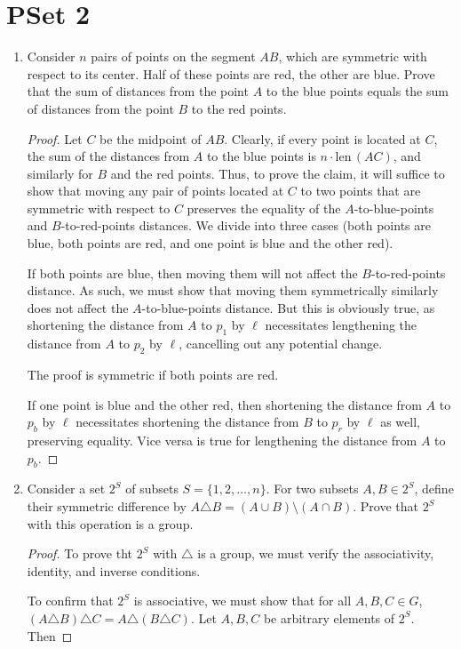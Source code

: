\documentclass[../apprentice.tex]{subfiles}
\begin{document}
\section{PSet 2}
\begin{enumerate}
    \item {}Consider $n$ pairs of points on the segment $AB$, which are symmetric with respect to its center. Half of these points are red, the other are blue. Prove that the sum of distances from the point $A$ to the blue points equals the sum of distances from the point $B$ to the red points.
    \begin{proof}
        Let $C$ be the midpoint of $AB$. Clearly, if every point is located at $C$, the sum of the distances from $A$ to the blue points is $n\cdot\text{len}\,(AC)$, and similarly for $B$ and the red points. Thus, to prove the claim, it will suffice to show that moving any pair of points located at $C$ to two points that are symmetric with respect to $C$ preserves the equality of the $A$-to-blue-points and $B$-to-red-points distances. We divide into three cases (both points are blue, both points are red, and one point is blue and the other red).\par
        If both points are blue, then moving them will not affect the $B$-to-red-points distance. As such, we must show that moving them symmetrically similarly does not affect the $A$-to-blue-points distance. But this is obviously true, as shortening the distance from $A$ to $p_1$ by $\ell$ necessitates lengthening the distance from $A$ to $p_2$ by $\ell$, cancelling out any potential change.\par
        The proof is symmetric if both points are red.\par
        If one point is blue and the other red, then shortening the distance from $A$ to $p_b$ by $\ell$ necessitates shortening the distance from $B$ to $p_r$ by $\ell$ as well, preserving equality. Vice versa is true for lengthening the distance from $A$ to $p_b$.
    \end{proof}
    \item Consider a set $2^S$ of subsets $S=\{1,2,\dots,n\}$. For two subsets $A,B\in 2^S$, define their symmetric difference by $A\triangle B=(A\cup B)\setminus(A\cap B)$. Prove that $2^S$ with this operation is a group.
    \begin{proof}
        To prove tht $2^S$ with $\triangle$ is a group, we must verify the associativity, identity, and inverse conditions.\par
        To confirm that $2^S$ is associative, we must show that for all $A,B,C\in G$, $(A\triangle B)\triangle C=A\triangle(B\triangle C)$. Let $A,B,C$ be arbitrary elements of $2^S$. Then

\end{proof}
\end{enumerate}
\end{document}
